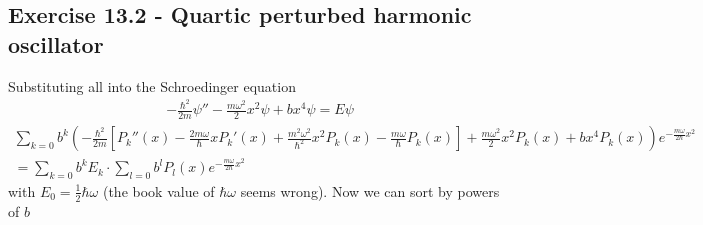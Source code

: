 \documentclass[../main.tex]{subfiles}
\begin{document}
\subsection{Exercise 13.2 - Quartic perturbed harmonic oscillator}
Substituting all into the Schroedinger equation
\begin{align}
-\frac{\hbar^2}{2m}\psi''-\frac{m\omega^2}{2}x^2\psi+bx^4\psi=E\psi
\end{align}
\begin{align}
\sum_{k=0}b^k\left(-\frac{\hbar^2}{2m}\left[P_k''(x)-\frac{2m\omega}{\hbar}xP_k'(x)+\frac{m^2\omega^2}{\hbar^2}x^2P_k(x)-\frac{m\omega}{\hbar}P_k(x)\right]+\frac{m\omega^2}{2}x^2P_k(x)+bx^4P_k(x)\right)e^{-\frac{m\omega}{2\hbar}x^2}\\
=\sum_{k=0}b^kE_k\cdot\sum_{l=0}b^lP_l(x)e^{-\frac{m\omega}{2\hbar}x^2}
\end{align}
with $E_0=\frac{1}{2}\hbar\omega$ (the book value of $\hbar\omega$ seems wrong). Now we can sort by powers of $b$
\end{document}
